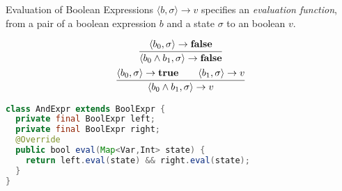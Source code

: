 \begin{frame}[fragile]{Evaluation of Boolean Expressions}
    $\langle b, \sigma \rangle \rightarrow v$ specifies an \emph{evaluation function}, from
    a pair of a boolean expression $b$ and a state $\sigma$ to an boolean $v$.\\
    \begin{overprint}
        \begin{gather*}
            \infer{\langle b_0 \wedge b_1 , \sigma \rangle \rightarrow \mathbf{false}}{\langle b_0 , \sigma \rangle \rightarrow \mathbf{false}} \\
            \infer{\langle b_0 \wedge b_1 , \sigma \rangle \rightarrow v}{\langle b_0 , \sigma \rangle \rightarrow \mathbf{true} \qquad \langle b_1 , \sigma \rangle \rightarrow v}
        \end{gather*}
        \begin{lstlisting}[language=java, basicstyle=\small]
class AndExpr extends BoolExpr {
  private final BoolExpr left;
  private final BoolExpr right;
  @Override
  public bool eval(Map<Var,Int> state) {
    return left.eval(state) && right.eval(state);
  }
}
        \end{lstlisting}
    \end{overprint}
\end{frame}

